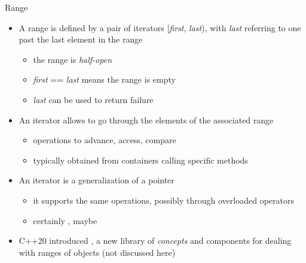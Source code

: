 \begin{frame}{Range}

  \begin{itemize}[<+->]
  \item A range is defined by a pair of \alert{iterators}
    [\textit{first}, \textit{last}), with \textit{last} referring to one
    past the last element in the range
    \begin{itemize}
    \item the range is \textit{half-open}
    \item \textit{first} == \textit{last} means the range is empty
    \item \textit{last} can be used to return failure
    \end{itemize}
  \item An \alert{iterator} allows to go through the elements of the associated
    range
    \begin{itemize}
    \item operations to advance, access, compare
    \item typically obtained from containers calling specific methods
    \end{itemize}
  \item An iterator is a generalization of a pointer
    \begin{itemize}
    \item it supports the same operations, possibly through overloaded operators
    \item certainly \code{* ++ -> == !=}, maybe \code{-{}- + - += -= <}
    \end{itemize}
  \item C++20 introduced , a new library of \textit{concepts} and components for dealing with ranges of
    objects (not discussed here)
  \end{itemize}

\end{frame}

